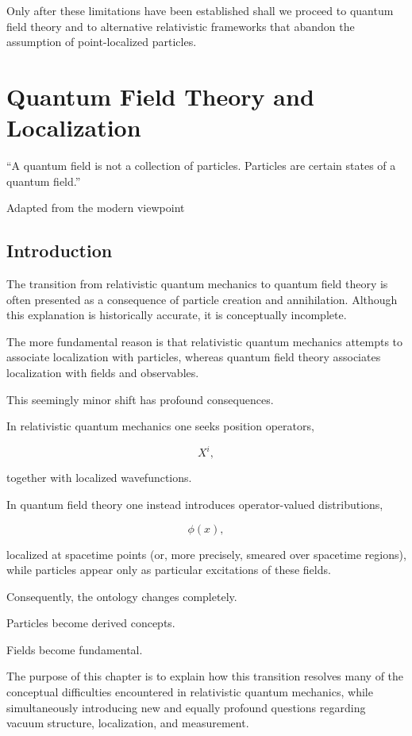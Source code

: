 Only after these limitations have been established shall we proceed to quantum
field theory and to alternative relativistic frameworks that abandon the
assumption of point-localized particles.
\chapter{Quantum Field Theory and Localization}

\epigraph{
``A quantum field is not a collection of particles.
Particles are certain states of a quantum field.''
}{Adapted from the modern viewpoint}


\section{Introduction}

The transition from relativistic quantum mechanics to quantum field theory is
often presented as a consequence of particle creation and annihilation.
Although this explanation is historically accurate, it is conceptually
incomplete.

The more fundamental reason is that relativistic quantum mechanics attempts to
associate localization with particles, whereas quantum field theory associates
localization with fields and observables.

This seemingly minor shift has profound consequences.

In relativistic quantum mechanics one seeks position operators,

\[
X^i,
\]

together with localized wavefunctions.

In quantum field theory one instead introduces operator-valued distributions,

\[
\phi(x),
\]

localized at spacetime points (or, more precisely, smeared over spacetime
regions), while particles appear only as particular excitations of these
fields.

Consequently, the ontology changes completely.

Particles become derived concepts.

Fields become fundamental.

The purpose of this chapter is to explain how this transition resolves many of
the conceptual difficulties encountered in relativistic quantum mechanics,
while simultaneously introducing new and equally profound questions regarding
vacuum structure, localization, and measurement.
